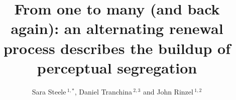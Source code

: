 \documentclass{frontiersSCNS} %
\def\firstAuthorLast{Steele {et~al.}} %
\def\Authors{Sara Steele\,$^{1,*}$, Daniel Tranchina\,$^{2,3}$ and John Rinzel\,$^{1,2}$}
\begin{document}
\onecolumn
{}

\title[Alternating renewal process describes buildup]{From one to many (and back again): an alternating renewal process describes the buildup of perceptual segregation}
\author[\firstAuthorLast ]{\Authors}
\address{}
\correspondance{}
\extraAuth{}%

\maketitle
\end{document}
